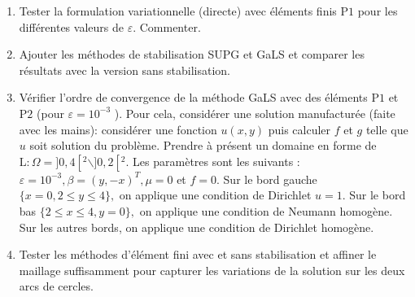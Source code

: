\documentclass[11pt,utf8]{article}
\begin{document}
\begin{enumerate}
  \item Tester la formulation variationnelle (directe) avec éléments finis $\mathrm{P} 1$ pour les différentes valeurs de $\varepsilon$. Commenter.
  \item Ajouter les méthodes de stabilisation SUPG et GaLS et comparer les résultats avec la version sans stabilisation.
  \item Vérifier l'ordre de convergence de la méthode GaLS avec des éléments $\mathrm{P} 1$ et $\mathrm{P} 2$ (pour $\varepsilon=10^{-3}$ ). 
  Pour cela, considérer une solution manufacturée (faite avec les mains): considérer une fonction $u(x, y)$ puis calculer $f$ et $g$ telle que $u$ soit solution du problème. 
  Prendre à présent un domaine en forme de $\mathrm{L}: \Omega=] 0,4\left[^2 \backslash ] 0,2\left[ ^2.\right.\right.$ 
  Les paramètres sont les suivants : $\varepsilon=10^{-3}, \beta=(y,-x)^{T}, \mu=0$ et $f=0 .$ 
  Sur le bord gauche $\{x=0,2 \leqslant y \leqslant 4\},$ on applique une condition de Dirichlet $u=1$. 
  Sur le bord bas $\{2 \leqslant x \leqslant 4, y=0\},$ on applique une condition de Neumann homogène. 
  Sur les autres bords, on applique une condition de Dirichlet homogène.
  \item Tester les méthodes d'élément fini avec et sans stabilisation et affiner le maillage suffisamment pour capturer les variations de la solution sur les deux arcs de cercles.  
\end{enumerate}
\end{document}
